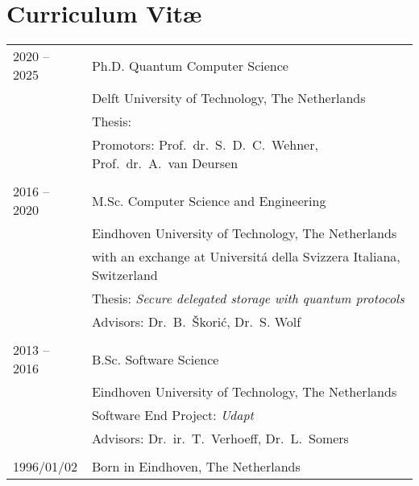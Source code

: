 \chapter*{Curriculum Vit\ae}

\makeatletter
\authors{\@firstname\ {\titleshape\@lastname}}
\def\thesistitle{\@title}
\makeatother

\newlength{\tabcolsepold}
\setlength{\tabcolsepold}{\tabcolsep}
\setlength{\tabcolsep}{0cm}

\noindent
\begin{tabularx}{\linewidth}{p{2cm}X}
    2020 -- 2025 & Ph.D. Quantum Computer Science \\
                 & Delft University of Technology, The Netherlands \\
                 & Thesis: \emph{\thesistitle} \\
                 & Promotors: Prof.\ dr.\ S.\ D.\ C.\ Wehner, Prof.\ dr.\ A.\ van Deursen \\
    \\
    2016 -- 2020 & M.Sc. Computer Science and Engineering \\
                 & Eindhoven University of Technology, The Netherlands \\
                 & with an exchange at Universitá della Svizzera Italiana, Switzerland \\
                 & Thesis: \emph{Secure delegated storage with quantum protocols} \\
                 & Advisors: Dr.\ B.\ Škorić, Dr.\ S. Wolf \\
    \\
    2013 -- 2016 & B.Sc. Software Science \\
                 & Eindhoven University of Technology, The Netherlands \\
                 & Software End Project: \emph{Udapt} \\
                 & Advisors: Dr.\ ir.\ T.\ Verhoeff, Dr.\ L.\ Somers \\
    \\
    1996/01/02   & Born in Eindhoven, The Netherlands \\
\end{tabularx}

\setlength{\tabcolsep}{\tabcolsepold}
